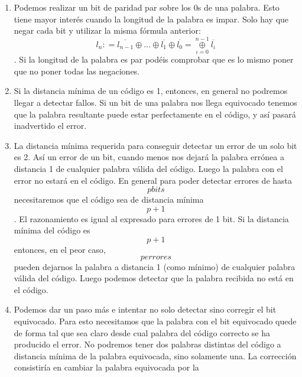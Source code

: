 \begin{enumerate}
\begin{enumerate}
\begin{enumerate}
\begin{enumerate}
        son iguales y el número de 1s será o 0 o 2, esto es, siempre
        par. Si fuese el código original de 2 bits de longitud, el bit
        de paridad debería de valer 1 si solo uno de los dos (no los
        dos) valiese 1. Esto vuelve a ser la suma exclusiva. Y así
        sucesivamente.
      \item
        Podemos realizar un bit de paridad par sobre los 0s de una
        palabra. Esto tiene mayor interés cuando la longitud de la
        palabra es impar. Solo hay que negar cada bit y utilizar la
        misma fórmula anterior:
        \[l_{n}{: = \overline{l_{n-1}}} \oplus \ldots \oplus \overline{l_{1}} \oplus {\overline{l_{0}} = \underset{\iota = 0}{\overset{n - 1}{\oplus}}}\overline{l_{\iota}}\].
        Si la lon\-gitud de la palabra es par podéis comprobar que es lo
        mismo poner que no poner todas las negaciones.
      \item
        Si la distancia mínima de un código es 1, entonces, en general
        no podremos lle\-gar a detectar fallos. Si un bit de una palabra
        nos llega equivocado tenemos que la palabra resultante puede
        estar perfectamente en el código, y así pasará inadvertido el
        error.
      \item
        La distancia mínima requerida para conseguir detectar un error
        de un solo bit es 2. Así un error de un bit, cuando menos nos
        dejará la palabra errónea a distancia 1 de cualquier palabra
        válida del código. Luego la palabra con el error no estará en el
        código. En general para poder detectar errores de hasta
        \[p\mathit{bits}\]necesitaremos que el código sea de distancia
        mínima \[p + 1\]. El razonamiento es igual al expre\-sado para
        errores de 1 bit. Si la distancia mínima del código es
        \[p + 1\]entonces, en el peor caso, \[p\mathit{errores}\]pueden
        dejarnos la palabra a distancia 1 (como míni\-mo) de cualquier
        palabra válida del código. Luego podemos detectar que la
        pala\-bra recibida no está en el código.
      \item
        Podemos dar un paso más e intentar no solo detectar sino
        corregir el bit equivo\-cado. Para esto necesitamos que la
        palabra con el bit equivocado quede de forma tal que sea claro
        desde cual palabra del código correcto se ha producido el error.
        No podremos tener dos palabras distintas del código a distancia
        mínima de la pa\-labra equivocada, sino solamente una. La
        corrección consistiría en cambiar la pa\-labra equivocada por la

\end{enumerate}
\end{enumerate}
\end{enumerate}
\end{enumerate}
